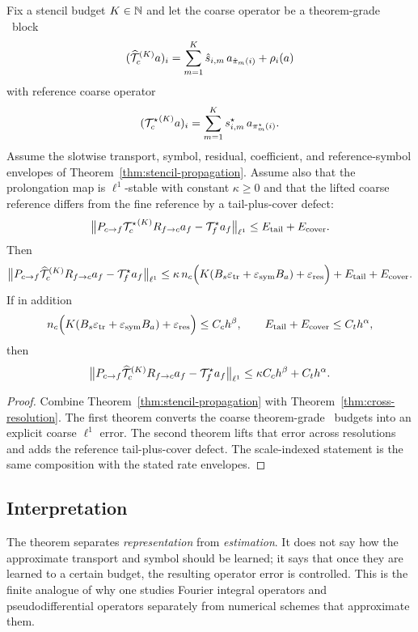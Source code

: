 \begin{corollary}
\label{cor:stencil-transfer-bridge}
Fix a stencil budget $K\in\mathbb N$ and let the coarse operator be a theorem-grade \MiNO\ block
\[
({\widehat{\mathcal T}_c}^{(K)} a)_i
=
\sum_{m=1}^{K}\hat s_{i,m}\,a_{\hat\pi_m(i)}+\rho_i(a)
\]
with reference coarse operator
\[
({\mathcal T^\star_c}^{(K)} a)_i
=
\sum_{m=1}^{K}s^\star_{i,m}\,a_{\pi_m^\star(i)}.
\]
Assume the slotwise transport, symbol, residual, coefficient, and reference-symbol envelopes of Theorem~\ref{thm:stencil-propagation}. Assume also that the prolongation map is $\ell^1$-stable with constant $\kappa\ge 0$ and that the lifted coarse reference differs from the fine reference by a tail-plus-cover defect:
\[
\bigl\|P_{c\to f}{\mathcal T^\star_c}^{(K)}R_{f\to c}a_f-\mathcal T^\star_f a_f\bigr\|_{\ell^1}
\le E_{\mathrm{tail}}+E_{\mathrm{cover}}.
\]
Then
\[
\bigl\|P_{c\to f}{\widehat{\mathcal T}_c}^{(K)}R_{f\to c}a_f-\mathcal T^\star_f a_f\bigr\|_{\ell^1}
\le
\kappa\,n_c\Bigl(K(B_s\varepsilon_{\mathrm{tr}}+\varepsilon_{\mathrm{sym}}B_a)+\varepsilon_{\mathrm{res}}\Bigr)
{}+
E_{\mathrm{tail}}+E_{\mathrm{cover}}.
\]
If in addition
\[
n_c\Bigl(K(B_s\varepsilon_{\mathrm{tr}}+\varepsilon_{\mathrm{sym}}B_a)+\varepsilon_{\mathrm{res}}\Bigr)\le C_c h^\beta,
\qquad
E_{\mathrm{tail}}+E_{\mathrm{cover}}\le C_t h^\alpha,
\]
then
\[
\bigl\|P_{c\to f}{\widehat{\mathcal T}_c}^{(K)}R_{f\to c}a_f-\mathcal T^\star_f a_f\bigr\|_{\ell^1}
\le
\kappa C_c h^\beta + C_t h^\alpha.
\]
\end{corollary}

\begin{proof}
Combine Theorem~\ref{thm:stencil-propagation} with Theorem~\ref{thm:cross-resolution}. The first theorem converts the coarse theorem-grade \MiNO\ budgets into an explicit coarse $\ell^1$ error. The second theorem lifts that error across resolutions and adds the reference tail-plus-cover defect. The scale-indexed statement is the same composition with the stated rate envelopes.
\end{proof}

\subsection{Interpretation}

The theorem separates \emph{representation} from \emph{estimation}. It does not say how the approximate transport and symbol should be learned; it says that once they are learned to a certain budget, the resulting operator error is controlled. This is the finite analogue of why one studies Fourier integral operators and pseudodifferential operators separately from numerical schemes that approximate them.

